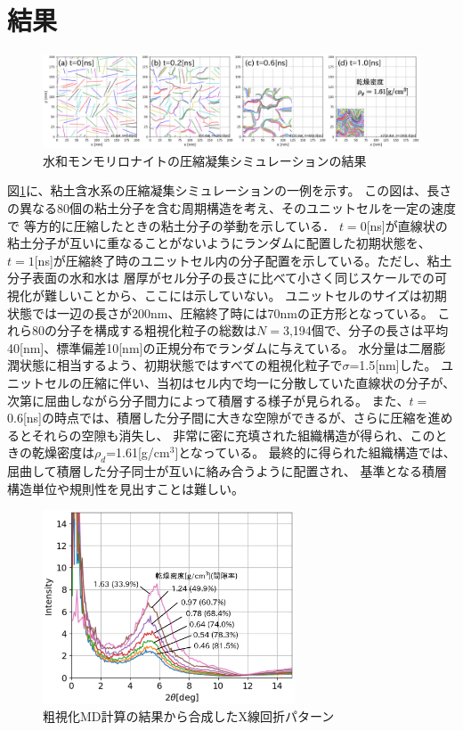 ﻿\documentclass[11pt,a4j]{jarticle}
\begin{document}
\section{結果}
\begin{figure}[h]
	\begin{center}
	\includegraphics[width=1.0\linewidth]{Figs/revs.eps} 
	\end{center}
	\caption{水和モンモリロナイトの圧縮凝集シミュレーションの結果} 
	\label{fig:fig2}
\end{figure}
図\ref{fig:fig2}に、粘土含水系の圧縮凝集シミュレーションの一例を示す。
この図は、長さの異なる80個の粘土分子を含む周期構造を考え、そのユニットセルを一定の速度で
等方的に圧縮したときの粘土分子の挙動を示している．
$t=0$[ns]が直線状の粘土分子が互いに重なることがないようにランダムに配置した初期状態を、
$t=1$[ns]が圧縮終了時のユニットセル内の分子配置を示している。ただし、粘土分子表面の水和水は
層厚がセル分子の長さに比べて小さく同じスケールでの可視化が難しいことから、ここには示していない。
ユニットセルのサイズは初期状態では一辺の長さが200nm、圧縮終了時には70nmの正方形となっている。
これら80の分子を構成する粗視化粒子の総数は$N=$3,194個で、分子の長さは平均40[nm]、標準偏差10[nm]の正規分布でランダムに与えている。
水分量は二層膨潤状態に相当するよう、初期状態ではすべての粗視化粒子で$\sigma$=1.5[nm]した。
ユニットセルの圧縮に伴い、当初はセル内で均一に分散していた直線状の分子が、次第に屈曲しながら分子間力によって積層する様子が見られる。
また、$t=$0.6[ns]の時点では、積層した分子間に大きな空隙ができるが、さらに圧縮を進めるとそれらの空隙も消失し、
非常に密に充填された組織構造が得られ、このときの乾燥密度は$\rho_d$=1.61[g/cm$^3$]となっている。
最終的に得られた組織構造では、屈曲して積層した分子同士が互いに絡み合うように配置され、
基準となる積層構造単位や規則性を見出すことは難しい。
\begin{figure}
	\centering
	\includegraphics[keepaspectratio,width=75mm]{Figs/xrd.eps}
	\caption{粗視化MD計算の結果から合成したX線回折パターン}
	\label{fig:fig3}
\end{figure}
\end{document}
